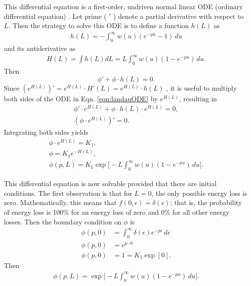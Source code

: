 This differential equation is a first-order, undriven normal linear ODE (ordinary differential equation) \cite{Borrelli}. Let prime ( $'$ ) denote a partial derivative with respect to $L$. Then the strategy to solve this ODE is to define a function $h(L)$ as
%
\begin{gather*}
h(L)=-\int_0 ^\infty w(u)  (e^{-pu}-1)\, du
\end{gather*}
and its antiderivative as
\begin{gather*}
H(L)=\int h(L) dL=L \int_0 ^\infty w(u)  (1-e^{-pu})\, du.
\end{gather*}
Then
\begin{equation}\label{eqn:landauODE}
\phi ' + \phi \cdot h(L) = 0.
\end{equation}
%
Since $(e^{H(L)}) ' = e^{H(L)}\cdot H'(L)= e^{H(L)}\cdot h(L)$ , it is useful to multiply both sides of the ODE in Eqn. \ref{eqn:landauODE} by $e^{H(L)}$, resulting in
\begin{gather*}
\phi ' \cdot e^{H(L)}+ \phi \cdot h(L) \cdot e^{H(L)} = 0,\\
(\phi\cdot e^{H(L)}) ' = 0.
\end{gather*}
Integrating both sides yields
\begin{gather*}
\phi\cdot e^{H(L)}=K_1,\\
\phi = K_1 e^{-H(L)},\\
\phi(p,L)=K_1 \exp\Big[-L\int_0 ^\infty w(u)  (1-e^{-pu})\, du\Big].
\end{gather*}

This differential equation is now solvable provided that there are initial conditions. The first observation is that for $L=0$, the only possible energy loss is zero. Mathematically, this means that $f(0,\epsilon)=\delta(\epsilon)$; that is, the probability of energy loss is 100\% for an energy loss of zero and 0\% for all other energy losses. Then the boundary condition on $\phi$ is
\begin{align}
\phi(p,0)&=\int_0 ^\infty \delta(\epsilon) e^{-p\epsilon}\, d\epsilon\nonumber\\
\phi(p,0)&=e^{p\cdot 0}\nonumber\\
\phi(p,0)&=1=K_1\exp[0].\nonumber%
\end{align}
Then
\begin{gather*}
\phi(p,L)=\exp\Big[-L\int_0 ^\infty w(u)  (1-e^{-pu})\, du\Big].
\end{gather*}

